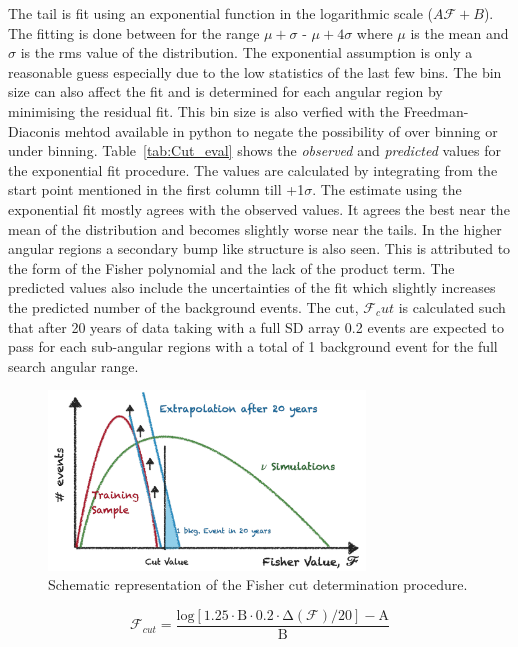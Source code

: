 The tail is fit using an exponential function in the logarithmic scale ($A \mathcal{F} + B$). The fitting is done between for the range $\mu + \sigma$ - $\mu + 4\sigma$ where $\mu$ is the mean and $\sigma$ is the rms value of the distribution. The exponential assumption is only a reasonable guess especially due to the low statistics of the last few bins. The bin size can also affect the fit and is determined for each angular region by minimising the residual fit. This bin size is also verfied with the Freedman-Diaconis mehtod available in python to negate the possibility of over binning or under binning. Table~\ref{tab:Cut_eval} shows the \textit{observed} and \textit{predicted} values for the exponential fit procedure. The values are calculated by integrating from the start point mentioned in the first column till +1$\sigma$. The estimate using the exponential fit mostly agrees with the observed values. It agrees the best near the mean of the distribution and becomes slightly worse near the tails. In the higher angular regions a secondary bump like structure is also seen. This is attributed to the form of the Fisher polynomial and the lack of the product term. The predicted values also include the uncertainties of the fit which slightly increases the predicted number of the background events. The cut, $\mathcal{F}_cut$ is calculated such that after 20 years of data taking with a full SD array 0.2 events are expected to pass for each sub-angular regions with a total of 1 background event for the full search angular range. 

\begin{figure}[t!]
  \centering
  \includegraphics[width=0.75\textwidth]{thesis_figures/Nu_analysis/Fisher_cut_schematic.pdf}
  \caption{Schematic representation of the Fisher cut determination procedure.}
  \label{fig:Fish_cut_schem}
\end{figure}

\begin{equation}
  \label{eq:fisher_poly_cut}
  \mathcal{F}_{cut} = \mathrm{\frac{log[1.25 \cdot B \cdot 0.2 \cdot \Delta (\mathcal{F}) / 20] - A}{B} }
\end{equation}


